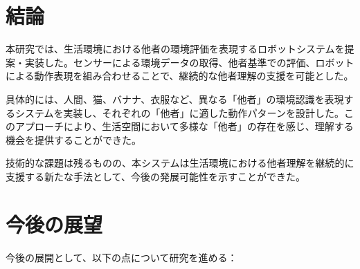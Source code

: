 \documentclass{cuxarticle}
\begin{document}
\section{結論}
本研究では、生活環境における他者の環境評価を表現するロボットシステムを提案・実装した。センサーによる環境データの取得、他者基準での評価、ロボットによる動作表現を組み合わせることで、継続的な他者理解の支援を可能とした。

具体的には、人間、猫、バナナ、衣服など、異なる「他者」の環境認識を表現するシステムを実装し、それぞれの「他者」に適した動作パターンを設計した。このアプローチにより、生活空間において多様な「他者」の存在を感じ、理解する機会を提供することができた。

技術的な課題は残るものの、本システムは生活環境における他者理解を継続的に支援する新たな手法として、今後の発展可能性を示すことができた。

\section{今後の展望}
今後の展開として、以下の点について研究を進める：
\end{document}
